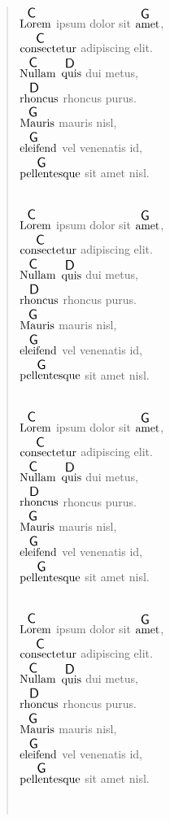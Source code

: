 \documentclass[twocolumn]{article}
\newcommand{\ch}[2]{$\overset{ \resizebox*{!}{1.2\height}{\textsf{#2}} }{\text{#1}}$}
\begin{document}
\begin{verse}

\ch{Lorem}{C} ipsum dolor sit \ch{amet}{G}, \\
\ch{consectetur}{C} adipiscing elit.\\
\ch{Nullam}{C} \ch{quis}{D} dui metus, \\
\ch{rhoncus}{D} rhoncus purus. \\
\ch{Mauris}{G} mauris nisl, \\
\ch{eleifend}{G} vel venenatis id, \\
\ch{pellentesque}{G} sit amet nisl.

~\\

\ch{Lorem}{C} ipsum dolor sit \ch{amet}{G}, \\
\ch{consectetur}{C} adipiscing elit.\\
\ch{Nullam}{C} \ch{quis}{D} dui metus, \\
\ch{rhoncus}{D} rhoncus purus. \\
\ch{Mauris}{G} mauris nisl, \\
\ch{eleifend}{G} vel venenatis id, \\
\ch{pellentesque}{G} sit amet nisl.

~\\

\ch{Lorem}{C} ipsum dolor sit \ch{amet}{G}, \\
\ch{consectetur}{C} adipiscing elit.\\
\ch{Nullam}{C} \ch{quis}{D} dui metus, \\
\ch{rhoncus}{D} rhoncus purus. \\
\ch{Mauris}{G} mauris nisl, \\
\ch{eleifend}{G} vel venenatis id, \\
\ch{pellentesque}{G} sit amet nisl.

~\\

\ch{Lorem}{C} ipsum dolor sit \ch{amet}{G}, \\
\ch{consectetur}{C} adipiscing elit.\\
\ch{Nullam}{C} \ch{quis}{D} dui metus, \\
\ch{rhoncus}{D} rhoncus purus. \\
\ch{Mauris}{G} mauris nisl, \\
\ch{eleifend}{G} vel venenatis id, \\
\ch{pellentesque}{G} sit amet nisl.

~\\


\end{verse}
\end{document}
